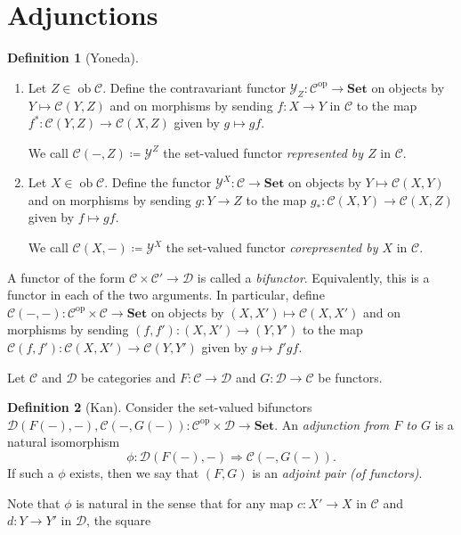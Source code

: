 \documentclass[10pt,letterpaper,cm]{nupset}
\theoremstyle{definition}
\newtheorem{definition}{Definition}[section]
\theoremstyle{theorem}
\theoremstyle{remark}
\newcommand{\1}{\mathbf{1}}
\renewcommand{\c}{\mathscr{C}}
\renewcommand{\d}{\mathscr{D}}
\newcommand{\y}{\mathcal{Y}}
\newcommand{\0}{\vec 0}
\DeclareMathOperator{\op}{op}
\DeclareMathOperator{\ob}{ob}
\begin{document}
\section{Adjunctions}

\begin{definition}[Yoneda] $ $
\begin{enumerate}
\item Let $Z \in \ob \c$. Define the contravariant functor $\y_Z: \c^{\op} \to \mathbf{Set}$  on objects by $Y \mapsto \c(Y, Z)$ and on morphisms by sending $f: X \to Y$ in $\c$ to the map $f^{\ast} : \c(Y, Z) \to \c(X, Z)$ given by $g\mapsto gf$. 

We call $\c(-, Z)\coloneqq \y^Z$ the set-valued functor \textit{represented by $Z$} in $\c$.
\item Let $X \in \ob \c$. Define the functor $\y^X : \c \to \mathbf{Set}$ on objects by $Y \mapsto \c(X, Y)$  and on morphisms by sending $g: Y \to Z$ to the map $g_{\ast} : \c(X, Y) \to \c(X, Z)$ given by $f \mapsto gf$. 

We call $\c(X, -)\coloneqq\y^X$ the set-valued functor \textit{corepresented by $X$} in $\c$.
\end{enumerate}
\end{definition}

\smallskip

A functor of the form $\c \times \c' \to \d$ is called a \textit{bifunctor}. Equivalently, this is a functor in each of the two arguments.
In particular, define $\c(-, -): \c^{\op} \times \c \to \mathbf{Set}$ on objects by $\left(X, X'\right) \mapsto \c(X, X')$ and on morphisms by sending $\left(f, f'\right) : \left(X, X'\right) \to \left(Y, Y'\right)$ to the map $\c(f, f') : \c(X, X') \to \c(Y, Y')$ given by $g \mapsto {f'}{g}{f}$.

\medskip

Let $\c$ and $\d$ be categories and $F : \c \to \d$ and $G: \d \to \c$ be functors. 


\begin{definition}[Kan]
Consider the set-valued bifunctors $ \d(F(-), -), \c(-, G(-)): \c^{\op} \times \d \to \mathbf{Set}$. An \textit{adjunction from $F$ to $G$} is a natural isomorphism $$\phi : \d(F(-), -) \Rightarrow \c(-, G(-)).$$
If such a $\phi$ exists, then we say that $\left(F, G\right)$ is an \textit{adjoint pair (of functors)}. 
\end{definition}

\smallskip


Note that $\phi$ is natural in the sense that for any map $c: X' \to X$ in $\c$ and $d: Y \to Y'$ in $\d$, the square
\end{document}
